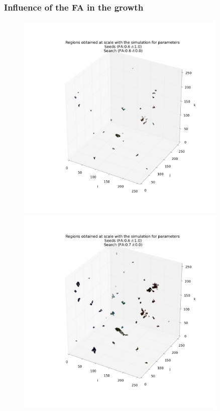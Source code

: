 \documentclass[12pt]{article}
\begin{document}
\subsubsection{Influence of the FA in the growth}
\begin{figure}[ht]
\centering
\begin{minipage}{.45\textwidth}
  \centering
  \includegraphics[width=0.9\textwidth]{groups/3d/seeds_FA_6/regions_nonoise_seeds_FA_06_Trace_10_search_FA_06_Trace_00_.png}
\end{minipage}%
\begin{minipage}{.45\textwidth}
  \centering
  \includegraphics[width=0.9\textwidth]{groups/3d/seeds_FA_6/regions_nonoise_seeds_FA_06_Trace_10_search_FA_07_Trace_00_.png}

\end{minipage}
\end{figure}
\end{document}
